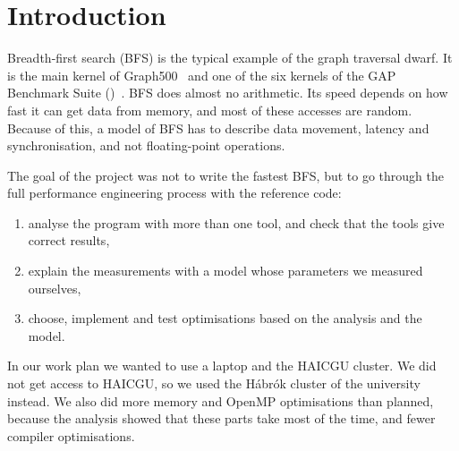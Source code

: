 \section{Introduction}

Breadth-first search (BFS) is the typical example of the graph traversal dwarf. It is the
main kernel of Graph500~\cite{graph500} and one of the six kernels of the GAP Benchmark Suite
(\gapbs)~\cite{beamer2015gap}. BFS does almost no arithmetic. Its speed depends on how fast
it can get data from memory, and most of these accesses are random. Because of this, a
model of BFS has to describe data movement, latency and synchronisation, and not
floating-point operations.

The goal of the project was not to write the fastest BFS, but to go through the full
performance engineering process with the \gapbs{} reference code:
\begin{enumerate}
  \item analyse the program with more than one tool, and check that the tools give correct
        results,
  \item explain the measurements with a model whose parameters we measured ourselves,
  \item choose, implement and test optimisations based on the analysis and the model.
\end{enumerate}

In our work plan we wanted to use a laptop and the HAICGU cluster. We did not get access to
HAICGU, so we used the Hábrók cluster of the university instead. We also did more
memory and OpenMP optimisations than planned, because the analysis showed that these parts
take most of the time, and fewer compiler optimisations.
